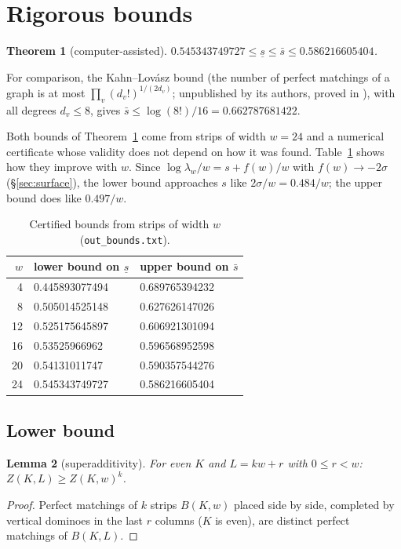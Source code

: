 \documentclass[11pt]{amsart}
\newtheorem{theorem}{Theorem}[section]
\newtheorem{lemma}[theorem]{Lemma}
\theoremstyle{definition}
\theoremstyle{remark}
\newcommand{\file}[1]{\texttt{#1}}
\begin{document}
\section{Rigorous bounds}\label{sec:bounds}

\begin{theorem}[computer-assisted]\label{thm:bounds}
$0.545343749727 \le \underline s \le \bar s \le 0.586216605404$.
\end{theorem}

For comparison, the Kahn--Lov\'asz bound (the number of perfect matchings of a graph is at most
$\prod_v (d_v!)^{1/(2 d_v)}$; unpublished by its authors, proved in \cite{alonfriedland2008}),
with all degrees $d_v \le 8$, gives
$\bar s \le \log(8!)/16 = 0.662787681422$.

Both bounds of Theorem~\ref{thm:bounds} come from strips of width $w = 24$ and a numerical
certificate whose validity does not depend on how it was found. Table~\ref{tab:bounds} shows how
they improve with $w$. Since $\log \lambda_w / w = s + f(w)/w$ with $f(w) \to -2\sigma$
(\S\ref{sec:surface}), the lower bound approaches $s$ like $2\sigma/w = 0.484/w$; the upper bound
does like $0.497/w$.

\begin{table}[ht]
\caption{Certified bounds from strips of width $w$ (\file{out\_bounds.txt}).}\label{tab:bounds}
\begin{tabular}{rll}
\toprule
$w$ & lower bound on $\underline s$ & upper bound on $\bar s$ \\
\midrule
4  & 0.445893077494 & 0.689765394232 \\
8  & 0.505014525148 & 0.627626147026 \\
12 & 0.525175645897 & 0.606921301094 \\
16 & 0.53525966962  & 0.596568952598 \\
20 & 0.54131011747  & 0.590357544276 \\
24 & 0.545343749727 & 0.586216605404 \\
\bottomrule
\end{tabular}
\end{table}

\subsection{Lower bound}

\begin{lemma}[superadditivity]\label{lem:super}
For even $K$ and $L = kw + r$ with $0 \le r < w$: $Z(K, L) \ge Z(K, w)^k$.
\end{lemma}
\begin{proof}
Perfect matchings of $k$ strips $B(K, w)$ placed side by side, completed by vertical dominoes in
the last $r$ columns ($K$ is even), are distinct perfect matchings of $B(K, L)$.
\end{proof}
\end{document}
